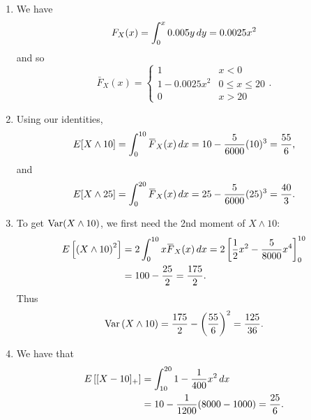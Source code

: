 \documentclass[notoc,notitlepage]{tufte-book}
\begin{document}
\begin{solution}
  \begin{enumerate}
    \item We have
      \begin{equation*}
        F_X(x) = \int_{0}^{x} 0.005y \mathop{}\!d{y} = 0.0025x^2
      \end{equation*}
      and so
      \begin{equation*}
        \bar{F}_X(x) = \begin{cases}
          1             & x < 0 \\
          1 - 0.0025x^2 & 0 \leq x \leq 20 \\
          0             & x > 20
        \end{cases}.
      \end{equation*}

    \item Using our identities,
      \begin{equation*}
        E [ X \land 10 ] = \int_{0}^{10} \bar{F}_X(x) \dif{x} = 10 - \frac{5}{6000} (10)^3 = \frac{55}{6},
      \end{equation*}
      and
      \begin{equation*}
        E [ X \land 25 ] = \int_{0}^{20} \bar{F}_X(x) \dif{x} = 25 - \frac{5}{6000} (25)^3 = \frac{40}{3}.
      \end{equation*}
    \item To get $\operatorname{Var}(X \land 10)$, we first need the 2nd moment of $X \land 10$:
      \begin{align*}
        E \left[ \left( X \land 10 \right)^2 \right] &= 2 \int_{0}^{10} x \bar{F}_X(x) \dif{x} = 2 \left[ \frac{1}{2} x^2 - \frac{5}{8000} x^4 \right]_{0}^{10} \\
                                                     &= 100 - \frac{25}{2} = \frac{175}{2}.
      \end{align*}
      Thus
      \begin{equation*}
        \operatorname{Var} \left( X \land 10 \right) = \frac{175}{2} - \left( \frac{55}{6} \right)^2 = \frac{125}{36}.
      \end{equation*}

    \item We have that
      \begin{align*}
        E \left[ [ X - 10 ]_+ \right] &= \int_{10}^{20} 1 - \frac{1}{400}x^2 \mathop{}\!d{x} \\
                                      &= 10 - \frac{1}{1200} (8000 - 1000) = \frac{25}{6}.
      \end{align*}


\end{enumerate}
\end{solution}
\end{document}
